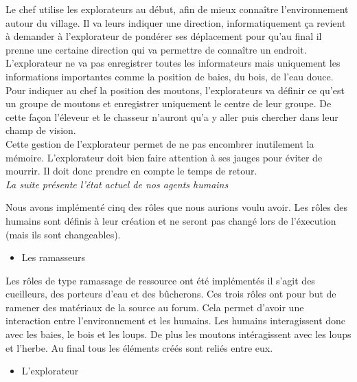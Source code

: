 \documentclass[12pt]{article}
\begin{document}
Le chef utilise les explorateurs au début, afin de mieux connaître 
l'environnement autour du village. Il va leurs indiquer une direction, 
informatiquement ça revient à demander à l'explorateur de pondérer ses 
déplacement pour qu'au final il prenne une certaine direction qui va permettre 
de connaître un endroit.\\

L'explorateur ne va pas enregistrer toutes les informateurs mais uniquement 
les informations importantes comme la position de baies, du bois, de l'eau douce. 
Pour indiquer au chef la position des moutons, l'explorateurs va définir ce 
qu'est un groupe de moutons et enregistrer uniquement le centre de leur 
groupe. De cette façon l'éleveur et le chasseur n'auront qu'a y aller puis 
chercher dans leur champ de vision.\\

Cette gestion de l'explorateur permet de ne pas encombrer inutilement la mémoire. 
L'explorateur doit bien faire attention à ses jauges pour éviter de mourrir. Il 
doit donc prendre en compte le temps de retour.\\

\textit{La suite présente l'état actuel de nos agents humains\\}

Nous avons implémenté cinq des rôles que nous aurions voulu avoir. Les rôles 
des humains sont définis à leur création et ne seront pas changé lors de 
l'éxecution (mais ils sont changeables).\\

		\begin{itemize}
		\item Les ramasseurs\\
		\end{itemize}

Les rôles de type ramassage de ressource ont été implémentés il s'agit des 
cueilleurs, des porteurs d'eau et des bûcherons. Ces trois  rôles ont pour but 
de ramener des matériaux de la source au forum. Cela permet d'avoir une 
interaction entre l'environnement et les humains. Les humains interagissent 
donc avec les baies, le bois et les loups. De plus les moutons intéragissent 
avec les loups et l'herbe. Au final tous les éléments créés sont reliés entre 
eux.\\

		\begin{itemize}
		\item L'explorateur\\
		\end{itemize}
\end{document}
